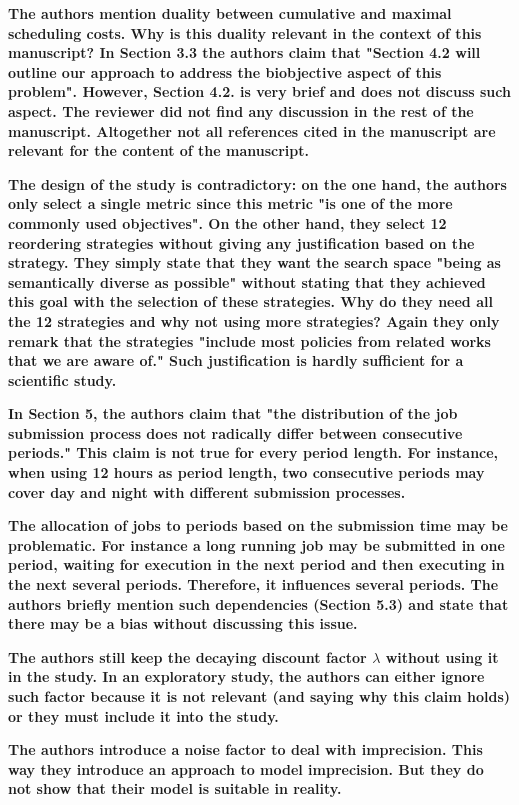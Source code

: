 \documentclass[]{article}
\begin{document}
\textbf{The authors mention duality between cumulative and maximal scheduling costs. Why is this duality relevant in the
context of this manuscript? In Section 3.3 the authors claim that "Section 4.2 will outline our approach to address the
biobjective aspect of this problem". However, Section 4.2. is very brief and does not discuss such aspect. The reviewer
did not find any discussion in the rest of the manuscript. Altogether not all references cited in the manuscript are
relevant for the content of the manuscript.
}

\textbf{The design of the study is contradictory: on the one hand, the authors only select a single metric since this metric
"is one of the more commonly used objectives". On the other hand, they select 12 reordering strategies without giving
any justification based on the strategy. They simply state that they want the search space "being as semantically
diverse as possible" without stating that they achieved this goal with the selection of these strategies. Why do they
need all the 12 strategies and why not using more strategies? Again they only remark that the strategies "include most
policies from related works that we are aware of." Such justification is hardly sufficient for a scientific study.
}

\textbf{In Section 5, the authors claim that "the distribution of the job submission process does not radically differ between
consecutive periods." This claim is not true for every period length. For instance, when using 12 hours as period
length, two consecutive periods may cover day and night with different submission processes.
}

\textbf{The allocation of jobs to periods based on the submission time may be problematic. For instance a long running job may
be submitted in one period, waiting for execution in the next period and then executing in the next several periods.
Therefore, it influences several periods. The authors briefly mention such dependencies (Section 5.3) and state that
there may be a bias without discussing this issue.
}

\textbf{The authors still keep the decaying discount factor $\lambda$ without using it in the study. In an exploratory study, the
authors can either ignore such factor because it is not relevant (and saying why this claim holds) or they must include
it into the study.
}

\textbf{The authors introduce a noise factor to deal with imprecision. This way they introduce an approach to model
imprecision. But they do not show that their model is suitable in reality.
}
\end{document}
